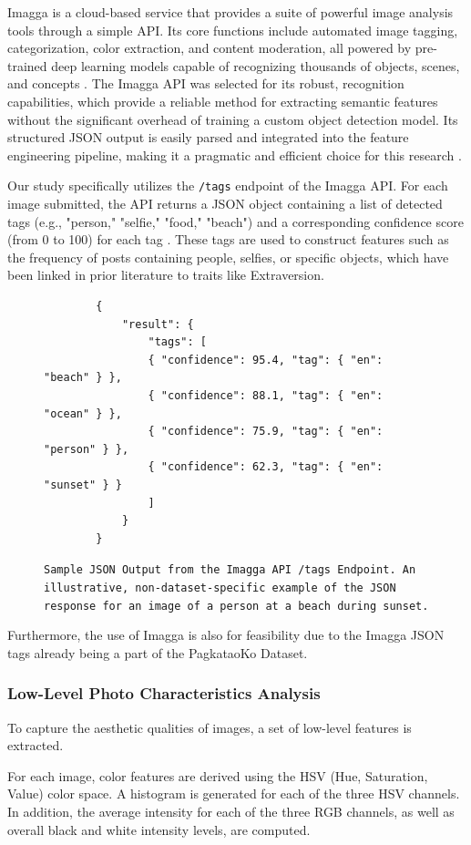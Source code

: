 Imagga is a cloud-based service that provides a suite of powerful image analysis tools through a simple API. Its core functions include automated image tagging, categorization, color extraction, and content moderation, all powered by pre-trained deep learning models capable of recognizing thousands of objects, scenes, and concepts \citep{imagga_website, imagga_solutions}. The Imagga API was selected for its robust, recognition capabilities, which provide a reliable method for extracting semantic features without the significant overhead of training a custom object detection model. Its structured JSON output is easily parsed and integrated into the feature engineering pipeline, making it a pragmatic and efficient choice for this research \citep{imagga_docs}.

Our study specifically utilizes the \texttt{/tags} endpoint of the Imagga API. For each image submitted, the API returns a JSON object containing a list of detected tags (e.g., "person," "selfie," "food," "beach") and a corresponding confidence score (from 0 to 100) for each tag \citep{imagga_docs}. These tags are used to construct features such as the frequency of posts containing people, selfies, or specific objects, which have been linked in prior literature to traits like Extraversion.

\begin{figure}[H]
	\centering
	\begin{verbatim}
		{
			"result": {
				"tags": [
				{ "confidence": 95.4, "tag": { "en": "beach" } },
				{ "confidence": 88.1, "tag": { "en": "ocean" } },
				{ "confidence": 75.9, "tag": { "en": "person" } },
				{ "confidence": 62.3, "tag": { "en": "sunset" } }
				]
			}
		}
	\end{verbatim}
	\caption{ \texttt{Sample JSON Output from the Imagga API /tags Endpoint. An illustrative, non-dataset-specific example of the JSON response for an image of a person at a beach during sunset.}}
	\label{fig:imagga_json}
\end{figure}

Furthermore, the use of Imagga is also for feasibility due to the Imagga JSON tags already being a part of the PagkataoKo Dataset.
\subsubsection{Low-Level Photo Characteristics Analysis}
To capture the aesthetic qualities of images, a set of low-level features is extracted.

For each image, color features are derived using the HSV (Hue, Saturation, Value) color space. A histogram is generated for each of the three HSV channels. In addition, the average intensity for each of the three RGB channels, as well as overall black and white intensity levels, are computed.

